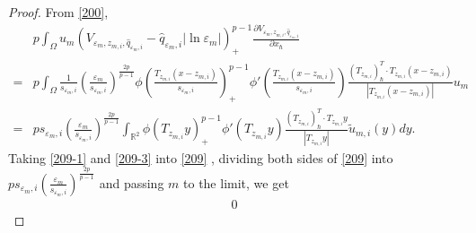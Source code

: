 \documentclass[12pt,reqno]{amsart}
\numberwithin{equation}{section}
\theoremstyle{definition}
\theoremstyle{remark}
\begin{document}
\begin{proof}
From  \eqref{200},
\begin{equation}\label{209-3}
\begin{split}
&p\int_{\Omega} u_m\left (V_{\varepsilon_m, z_{m,i}, \hat{q}_{\varepsilon_m,i}}-\hat{q}_{\varepsilon_m,i}|\ln\varepsilon_m|\right )^{p-1}_+ \frac{\partial V_{\varepsilon_m, z_{m,i}, \hat{q}_{\varepsilon_m,i}}}{\partial x_\hbar}\\
=&p\int_{\Omega}\frac{1}{s_{\varepsilon_m,i}}\left( \frac{\varepsilon_m}{s_{\varepsilon_m,i}}\right)^{\frac{2p}{p-1}} \phi\left( \frac{T_{z_{m,i}}(x-z_{m,i})}{s_{\varepsilon_m,i}}\right)^{p-1}_+\phi'\left( \frac{T_{z_{m,i}}(x-z_{m,i})}{s_{\varepsilon_m,i}}\right)\frac{(T_{z_{m,i}})_\hbar^T\cdot T_{z_{m,i}}(x-z_{m,i})}{|T_{z_{m,i}}(x-z_{m,i})|}u_m\\
=&ps_{\varepsilon_m,i}\left( \frac{\varepsilon_m}{s_{\varepsilon_m,i}}\right)^{\frac{2p}{p-1}}\int_{\mathbb{R}^2}\phi(T_{z_{m,i}}y)^{p-1}_+\phi'(T_{z_{m,i}}y)\frac{(T_{z_{m,i}})_\hbar^T\cdot T_{z_{m,i}}y}{|T_{z_{m,i}}y|}\tilde{u}_{m,i}(y)dy.
\end{split}
\end{equation}
Taking \eqref{209-1}  and \eqref{209-3} into \eqref{209}
, dividing both sides of \eqref{209} into $ ps_{\varepsilon_m,i}(\frac{\varepsilon_m}{s_{\varepsilon_m,i}})^{\frac{2p}{p-1}} $ and passing $ m $ to the limit, we get
\begin{equation*}
\begin{split}
0%

\end{split}
\end{equation*}
\end{proof}
\end{document}
